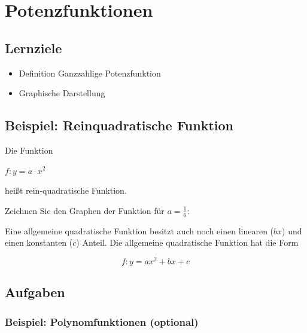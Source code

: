 \section{Potenzfunktionen}

\subsection*{Lernziele}

\begin{itemize}
\item Definition Ganzzahlige Potenzfunktion
\item Graphische Darstellung
\end{itemize}
\newpage


\subsection{Beispiel: Reinquadratische Funktion}
Die Funktion

$f: y = a\cdot{}x^2$

heißt rein-quadratische Funktion.

Zeichnen Sie den Graphen der Funktion für $a=\frac{1}{6}$:




\begin{bemerkung}{}{}
Eine allgemeine quadratische Funktion besitzt auch noch einen linearen ($bx$) und einen konstanten ($c$) Anteil. Die allgemeine quadratische Funktion hat die Form

$$f: y= ax^2 + bx + c$$
\end{bemerkung}



\subsection*{Aufgaben}

\newpage
\subsubsection{Beispiel: Polynomfunktionen (optional)}

